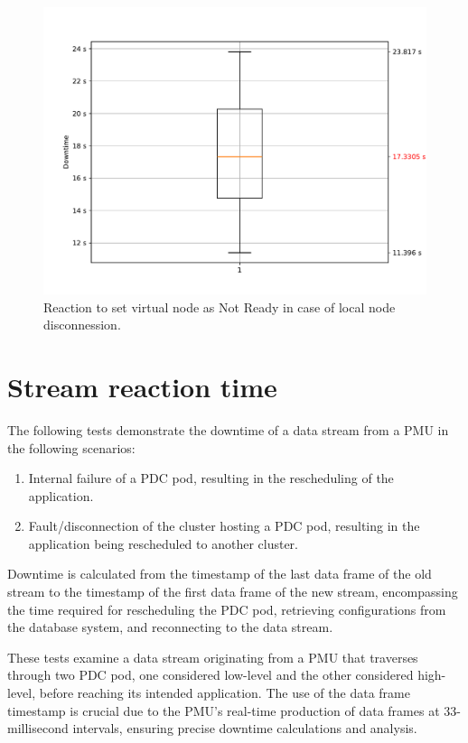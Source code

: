 \begin{figure}[ht]\centering
\includegraphics[scale=0.5]{Pictures/k3s-reaction2}
\caption{Reaction to set virtual node as Not Ready in case of local node disconnession.}\label{graph:k-reaction2}
\end{figure}

\section{Stream reaction time}
The following tests demonstrate the downtime of a data stream from a PMU in the following scenarios:

\begin{enumerate}
\item Internal failure of a PDC pod, resulting in the rescheduling of the application. 
\item Fault/disconnection of the cluster hosting a PDC pod, resulting in the application being rescheduled to another cluster.
\end{enumerate}

Downtime is calculated from the timestamp of the last data frame of the old stream to the timestamp of the first data frame of the new stream, encompassing the time required for rescheduling the PDC pod, retrieving configurations from the database system, and reconnecting to the data stream.

These tests examine a data stream originating from a PMU that traverses through two PDC pod, one considered low-level and the other considered high-level, before reaching its intended application. The use of the data frame timestamp is crucial due to the PMU's real-time production of data frames at 33-millisecond intervals, ensuring precise downtime calculations and analysis.

